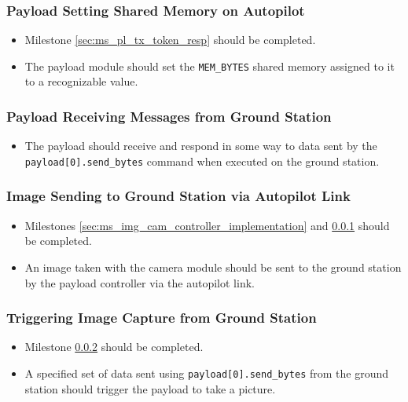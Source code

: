 	\subsubsection{Payload Setting Shared Memory on Autopilot}
		\label{sec:ms_pl_shared_mem_set}
		\begin{itemize}
			\item 	Milestone \ref{sec:ms_pl_tx_token_resp}
				should be completed.
			\item 	The payload module should set the \verb+MEM_BYTES+ 
				shared memory assigned to it to a recognizable value.
		\end{itemize}

	\subsubsection{Payload Receiving Messages from Ground Station}
		\label{sec:ms_pl_rx_msg_gs}
		\begin{itemize}
			\item 	The payload should receive and respond in some way to 
				data sent by the \verb+payload[0].send_bytes+ command
				when executed on the ground station.
		\end{itemize}

	\subsubsection{Image Sending to Ground Station via Autopilot Link}
		\label{sec:ms_pl_img_sending_gs}
		\begin{itemize}
			\item 	Milestones \ref{sec:ms_img_cam_controller_implementation} and \ref{sec:ms_pl_shared_mem_set}
				should be completed.
			\item 	An image taken with the camera module should be sent to the
				ground station by the payload controller via the autopilot link.
		\end{itemize}


	\subsubsection{Triggering Image Capture from Ground Station}
		\label{sec:ms_pl_img_gs_trigger}
		\begin{itemize}
			\item 	Milestone \ref{sec:ms_pl_rx_msg_gs}
				should be completed.
			\item 	A specified set of data sent using \verb+payload[0].send_bytes+
				from the ground station should trigger the payload to take a picture.
		\end{itemize}

